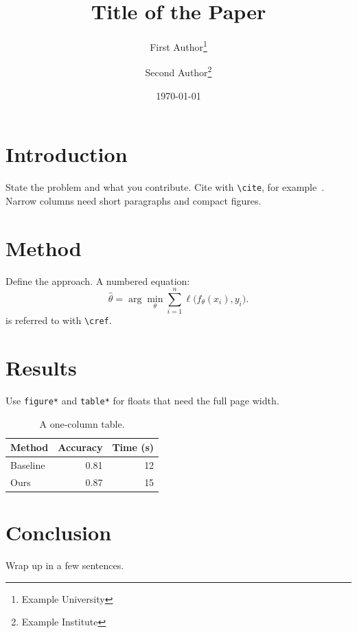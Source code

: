 \documentclass[10pt,a4paper,twocolumn]{article}
\title{Title of the Paper}
\author{First Author\thanks{Example University} \and Second Author\thanks{Example Institute}}
\date{\today}
\begin{document}

\section{Introduction}
State the problem and what you contribute. Cite with \verb|\cite|, for example~\cite{knuth84}.
Narrow columns need short paragraphs and compact figures.

\section{Method}\label{sec:method}
Define the approach. A numbered equation:
\begin{equation}
  \hat{\theta} = \arg\min_\theta \sum_{i=1}^{n} \ell\bigl(f_\theta(x_i), y_i\bigr).
  \label{eq:erm}
\end{equation}
 is referred to with \verb|\cref|.

\section{Results}
Use \texttt{figure*} and \texttt{table*} for floats that need the full page width.

\begin{table}[t]
  \centering
  \caption{A one-column table.}
  \begin{tabular}{lrr}
    \toprule
    Method & Accuracy & Time (s) \\
    \midrule
    Baseline & 0.81 & 12 \\
    Ours & 0.87 & 15 \\
    \bottomrule
  \end{tabular}
\end{table}

\section{Conclusion}
Wrap up in a few sentences.

\printbibliography
\end{document}
